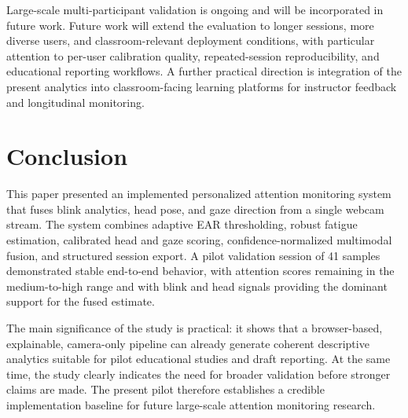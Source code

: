 \documentclass[conference]{IEEEtran}
\begin{document}
Large-scale multi-participant validation is ongoing and will be incorporated in future work. Future work will extend the evaluation to longer sessions, more diverse users, and classroom-relevant deployment conditions, with particular attention to per-user calibration quality, repeated-session reproducibility, and educational reporting workflows. A further practical direction is integration of the present analytics into classroom-facing learning platforms for instructor feedback and longitudinal monitoring.

\section{Conclusion}
This paper presented an implemented personalized attention monitoring system that fuses blink analytics, head pose, and gaze direction from a single webcam stream. The system combines adaptive EAR thresholding, robust fatigue estimation, calibrated head and gaze scoring, confidence-normalized multimodal fusion, and structured session export. A pilot validation session of 41 samples demonstrated stable end-to-end behavior, with attention scores remaining in the medium-to-high range and with blink and head signals providing the dominant support for the fused estimate.

The main significance of the study is practical: it shows that a browser-based, explainable, camera-only pipeline can already generate coherent descriptive analytics suitable for pilot educational studies and draft reporting. At the same time, the study clearly indicates the need for broader validation before stronger claims are made. The present pilot therefore establishes a credible implementation baseline for future large-scale attention monitoring research.
\end{document}
